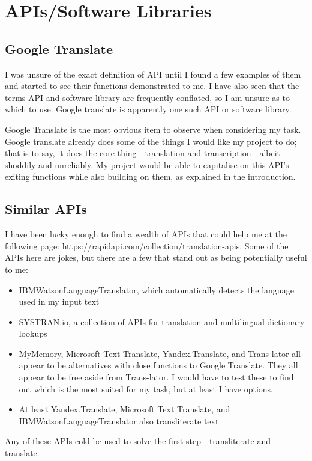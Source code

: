 \documentclass{article}
\begin{document}
\section{APIs/Software Libraries}
\subsection{Google Translate}
I was unsure of the exact definition of API until I found a few examples of them and started to see their functions demonstrated to me. I have also seen that the terms API and software library are frequently conflated, so I am unsure as to which to use. Google translate is apparently one such API or software library.

Google Translate is the most obvious item to observe when considering my task. Google translate already does some of the things I would like my project to do; that is to say, it does the core thing - translation and transcription - albeit shoddily and unreliably. My project would be able to capitalise on this API's exiting functions while also building on them, as explained in the introduction.

\subsection{Similar APIs}
I have been lucky enough to find a wealth of APIs that could help me at the following page: https://rapidapi.com/collection/translation-apis. Some of the APIs here are jokes, but there are a few that stand out as being potentially useful to me:
\begin{itemize}
\item IBMWatsonLanguageTranslator, which automatically detects the language used in my input text
\item SYSTRAN.io, a collection of APIs for translation and multilingual dictionary lookups
\item MyMemory, Microsoft Text Translate, Yandex.Translate, and Trans-lator all appear to be alternatives with close functions to Google Translate. They all appear to be free aside from Trans-lator. I would have to test these to find out which is the most suited for my task, but at least I have options.
\item At least Yandex.Translate, Microsoft Text Translate, and IBMWatsonLanguageTranslator also transliterate text.
\end{itemize}

Any of these APIs cold be used to solve the first step - transliterate and translate.
\end{document}
